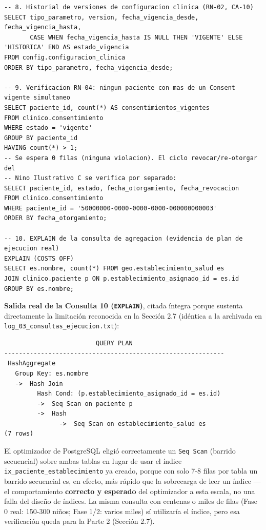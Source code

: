 \documentclass[11pt,a4paper]{article}
\begin{document}
\begin{samepage}
\begin{verbatim}
-- 8. Historial de versiones de configuracion clinica (RN-02, CA-10)
SELECT tipo_parametro, version, fecha_vigencia_desde, fecha_vigencia_hasta,
       CASE WHEN fecha_vigencia_hasta IS NULL THEN 'VIGENTE' ELSE 'HISTORICA' END AS estado_vigencia
FROM config.configuracion_clinica
ORDER BY tipo_parametro, fecha_vigencia_desde;

-- 9. Verificacion RN-04: ningun paciente con mas de un Consent vigente simultaneo
SELECT paciente_id, count(*) AS consentimientos_vigentes
FROM clinico.consentimiento
WHERE estado = 'vigente'
GROUP BY paciente_id
HAVING count(*) > 1;
-- Se espera 0 filas (ninguna violacion). El ciclo revocar/re-otorgar del
-- Nino Ilustrativo C se verifica por separado:
SELECT paciente_id, estado, fecha_otorgamiento, fecha_revocacion
FROM clinico.consentimiento
WHERE paciente_id = '50000000-0000-0000-0000-000000000003'
ORDER BY fecha_otorgamiento;

-- 10. EXPLAIN de la consulta de agregacion (evidencia de plan de ejecucion real)
EXPLAIN (COSTS OFF)
SELECT es.nombre, count(*) FROM geo.establecimiento_salud es
JOIN clinico.paciente p ON p.establecimiento_asignado_id = es.id
GROUP BY es.nombre;
\end{verbatim}\end{samepage}

\textbf{Salida real de la Consulta 10 (\texttt{EXPLAIN})}, citada íntegra porque sustenta directamente la limitación reconocida en la Sección 2.7 (idéntica a la archivada en \texttt{log\_03\_consultas\_ejecucion.txt}):

\begin{samepage}\begin{verbatim}
                         QUERY PLAN
------------------------------------------------------------
 HashAggregate
   Group Key: es.nombre
   ->  Hash Join
         Hash Cond: (p.establecimiento_asignado_id = es.id)
         ->  Seq Scan on paciente p
         ->  Hash
               ->  Seq Scan on establecimiento_salud es
(7 rows)
\end{verbatim}\end{samepage}

El optimizador de PostgreSQL eligió correctamente un \texttt{Seq\ Scan} (barrido secuencial) sobre ambas tablas en lugar de usar el índice \texttt{ix\_paciente\_establecimiento} ya creado, porque con solo 7-8 filas por tabla un barrido secuencial es, en efecto, más rápido que la sobrecarga de leer un índice --- el comportamiento \textbf{correcto y esperado} del optimizador a esta escala, no una falla del diseño de índices. La misma consulta con centenas o miles de filas (Fase 0 real: 150-300 niños; Fase 1/2: varios miles) sí utilizaría el índice, pero esa verificación queda para la Parte 2 (Sección 2.7).
\end{document}
